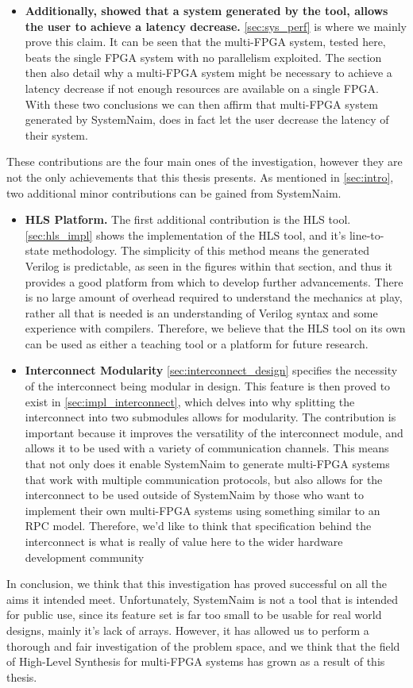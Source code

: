 \begin{itemize}
    \item \textbf{Additionally, showed that a system generated by the tool, allows the user to achieve a latency decrease.} \autoref{sec:sys_perf} is where we mainly prove this claim. It can be seen that the multi-FPGA system, tested here, beats the single FPGA system with no parallelism exploited. The section then also detail why a multi-FPGA system might be necessary to achieve a latency decrease if not enough resources are available on a single FPGA. With these two conclusions we can then affirm that multi-FPGA system generated by SystemNaim, does in fact let the user decrease the latency of their system.
\end{itemize}

These contributions are the four main ones of the investigation, however they are not the only achievements that this thesis presents. As mentioned in \autoref{sec:intro}, two additional minor contributions can be gained from SystemNaim.

\begin{itemize}
    \item \textbf{HLS Platform.} The first additional contribution is the HLS tool. \autoref{sec:hls_impl} shows the implementation of the HLS tool, and it's line-to-state methodology. The simplicity of this method means the generated Verilog is predictable, as seen in the figures within that section, and thus it provides a good platform from which to develop further advancements. There is no large amount of overhead required to understand the mechanics at play, rather all that is needed is an understanding of Verilog syntax and some experience with compilers. Therefore, we believe that the HLS tool on its own can be used as either a teaching tool or a platform for future research.
    \item \textbf{Interconnect Modularity} \autoref{sec:interconnect_design} specifies the necessity of the interconnect being modular in design. This feature is then proved to exist in \autoref{sec:impl_interconnect}, which delves into why splitting the interconnect into two submodules allows for modularity. The contribution is important because it improves the versatility of the interconnect module, and allows it to be used with a variety of communication channels. This means that not only does it enable SystemNaim to generate multi-FPGA systems that work with multiple communication protocols, but also allows for the interconnect to be used outside of SystemNaim by those who want to implement their own multi-FPGA systems using something similar to an RPC model. Therefore, we'd like to think that specification behind the interconnect is what is really of value here to the wider hardware development community
\end{itemize}

In conclusion, we think that this investigation has proved successful on all the aims it intended meet. Unfortunately, SystemNaim is not a tool that is intended for public use, since its feature set is far too small to be usable for real world designs, mainly it's lack of arrays. However, it has allowed us to perform a thorough and fair investigation of the problem space, and we think that the field of High-Level Synthesis for multi-FPGA systems has grown as a result of this thesis. 